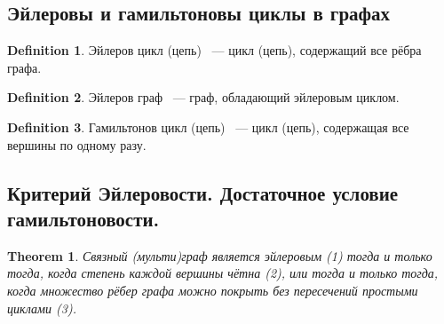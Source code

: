\documentclass[a4paper]{article}
\theoremstyle{plain}
\newtheorem{theorem}{Theorem}
\theoremstyle{remark}
\theoremstyle{definition}
\newtheorem*{definition-star}{Definition}
\begin{document}
\subsection{Эйлеровы и гамильтоновы циклы в графах}
\begin{definition-star} Эйлеров цикл (цепь) ~--- цикл (цепь), содержащий все рёбра графа.
\end{definition-star}
\begin{definition-star} Эйлеров граф ~--- граф, обладающий эйлеровым циклом.
\end{definition-star}
\begin{definition-star} Гамильтонов цикл (цепь) ~--- цикл (цепь), содержащая все вершины по одному разу.
\end{definition-star}

\subsection{Критерий Эйлеровости. Достаточное условие гамильтоновости.}
\begin{theorem} Связный (мульти)граф является эйлеровым (1) тогда и только тогда, когда степень каждой вершины чётна (2), или тогда и только тогда, когда множество рёбер графа можно покрыть без пересечений простыми циклами (3).
\end{theorem}
\end{document}
